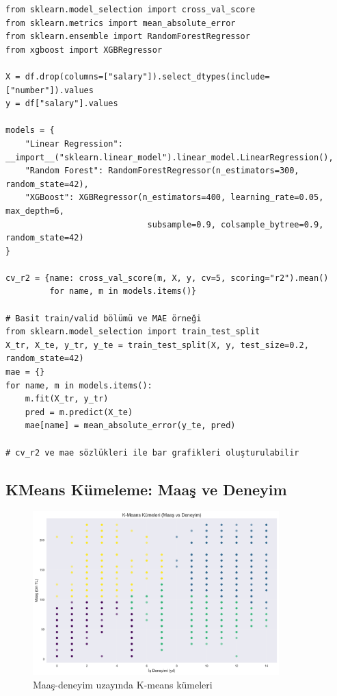 \documentclass[12pt,a4paper]{article}
\begin{document}
\begin{lstlisting}[style=python, caption={Model değerlendirme grafikleri için örnek kod}]
from sklearn.model_selection import cross_val_score
from sklearn.metrics import mean_absolute_error
from sklearn.ensemble import RandomForestRegressor
from xgboost import XGBRegressor

X = df.drop(columns=["salary"]).select_dtypes(include=["number"]).values
y = df["salary"].values

models = {
    "Linear Regression": __import__("sklearn.linear_model").linear_model.LinearRegression(),
    "Random Forest": RandomForestRegressor(n_estimators=300, random_state=42),
    "XGBoost": XGBRegressor(n_estimators=400, learning_rate=0.05, max_depth=6,
                             subsample=0.9, colsample_bytree=0.9, random_state=42)
}

cv_r2 = {name: cross_val_score(m, X, y, cv=5, scoring="r2").mean()
         for name, m in models.items()}

# Basit train/valid bölümü ve MAE örneği
from sklearn.model_selection import train_test_split
X_tr, X_te, y_tr, y_te = train_test_split(X, y, test_size=0.2, random_state=42)
mae = {}
for name, m in models.items():
    m.fit(X_tr, y_tr)
    pred = m.predict(X_te)
    mae[name] = mean_absolute_error(y_te, pred)

# cv_r2 ve mae sözlükleri ile bar grafikleri oluşturulabilir
\end{lstlisting}

\subsection{K\textendash Means Kümeleme: Maaş ve Deneyim}
\begin{figure}[H]
    \centering
    \includegraphics[width=0.85\textwidth]{22_kmeans_salary_experience.png}
    \caption{Maaş-deneyim uzayında K-means kümeleri}
\end{figure}
\end{document}
